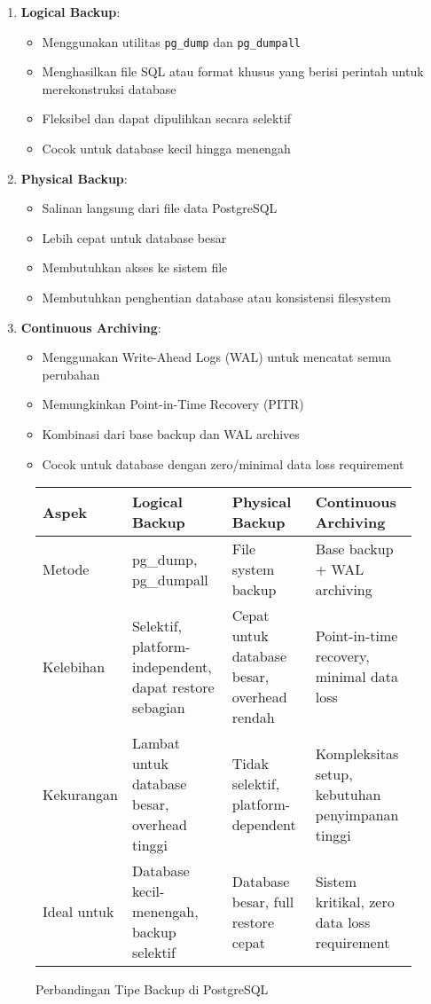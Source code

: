 \begin{enumerate}
    \item \textbf{Logical Backup}: 
    \begin{itemize}
        \item Menggunakan utilitas \texttt{pg\_dump} dan \texttt{pg\_dumpall}
        \item Menghasilkan file SQL atau format khusus yang berisi perintah untuk merekonstruksi database
        \item Fleksibel dan dapat dipulihkan secara selektif
        \item Cocok untuk database kecil hingga menengah
    \end{itemize}
    
    \item \textbf{Physical Backup}:
    \begin{itemize}
        \item Salinan langsung dari file data PostgreSQL
        \item Lebih cepat untuk database besar
        \item Membutuhkan akses ke sistem file
        \item Membutuhkan penghentian database atau konsistensi filesystem
    \end{itemize}
    
    \item \textbf{Continuous Archiving}:
    \begin{itemize}
        \item Menggunakan Write-Ahead Logs (WAL) untuk mencatat semua perubahan
        \item Memungkinkan Point-in-Time Recovery (PITR)
        \item Kombinasi dari base backup dan WAL archives
        \item Cocok untuk database dengan zero/minimal data loss requirement
    \end{itemize}
\end{enumerate}

\begin{figure}[h]
	\centering
	\begin{tabular}{|l|p{4cm}|p{4cm}|p{4cm}|}
		\hline
		\textbf{Aspek} & \textbf{Logical Backup} & \textbf{Physical Backup} & \textbf{Continuous Archiving} \\
		\hline
		Metode & pg\_dump, pg\_dumpall & File system backup & Base backup + WAL archiving \\
		\hline
		Kelebihan & Selektif, platform-independent, dapat restore sebagian & Cepat untuk database besar, overhead rendah & Point-in-time recovery, minimal data loss \\
		\hline
		Kekurangan & Lambat untuk database besar, overhead tinggi & Tidak selektif, platform-dependent & Kompleksitas setup, kebutuhan penyimpanan tinggi \\
		\hline
		Ideal untuk & Database kecil-menengah, backup selektif & Database besar, full restore cepat & Sistem kritikal, zero data loss requirement \\
		\hline
	\end{tabular}
	\caption{Perbandingan Tipe Backup di PostgreSQL}
\end{figure}

